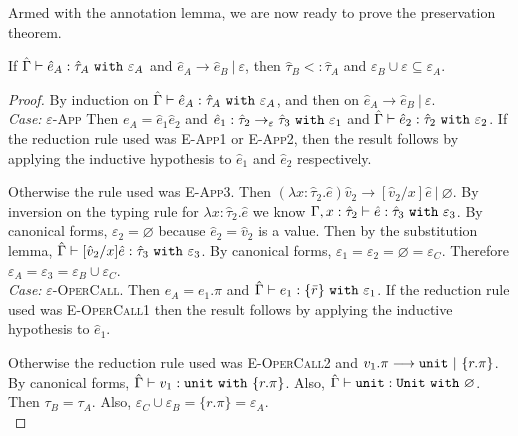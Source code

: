 Armed with the annotation lemma, we are now ready to prove the preservation theorem.

\begin{theorem}[Preservation]
If $\hat \Gamma \vdash \hat e_A: \hat \tau_A~\mathtt{with}~ \varepsilon_A$ and $\hat e_A \longrightarrow \hat e_B~|~\varepsilon$, then $\hat \tau_B <: \hat \tau_A$ and $\varepsilon_B \cup \varepsilon \subseteq \varepsilon_A$.
\end{theorem}

\begin{proof} By induction on $\hat \Gamma \vdash \hat e_A: \hat \tau_A~\mathtt{with}~ \varepsilon_A$, and then on $\hat e_A \longrightarrow \hat e_B~|~\varepsilon$. \\

\textit{Case:} \textsc{$\varepsilon$-App} Then $e_A = \hat e_1 \hat e_2$ and $\hat e_1: \hat \tau_2 \rightarrow_{\varepsilon} \hat \tau_3~\mathtt{with}~ \varepsilon_1$ and $\hat \Gamma \vdash \hat e_2: \hat \tau_2~\mathtt{with}~ \varepsilon_2$. If the reduction rule used was \textsc{E-App1} or \textsc{E-App2}, then the result follows by applying the inductive hypothesis to $\hat e_1$ and $\hat e_2$ respectively.

Otherwise the rule used was \textsc{E-App3}. Then $(\lambda x: \hat \tau_2.\hat e)\hat v_2 \longrightarrow [\hat v_2/x]\hat e~|~\varnothing$. By inversion on the typing rule for $\lambda x: \hat \tau_2.\hat e$ we know $\Gamma, x: \hat \tau_2 \vdash \hat e: \hat \tau_3~\mathtt{with}~ \varepsilon_3$. By canonical forms, $\varepsilon_2 = \varnothing$ because $\hat e_2 = \hat v_2$ is a value. Then by the substitution lemma, $\hat \Gamma \vdash [\hat v_2/x]\hat e : \hat \tau_3~\mathtt{with}~ \varepsilon_3$. By canonical forms, $\varepsilon_1 = \varepsilon_2 = \varnothing = \varepsilon_C$. Therefore $\varepsilon_A = \varepsilon_3 = \varepsilon_B \cup \varepsilon_C$.\\

\textit{Case:} \textsc{$\varepsilon$-OperCall}. Then $e_A = e_1.\pi$ and $\hat \Gamma \vdash e_1 : \{ \bar r \}~\mathtt{with}~ \varepsilon_1$. If the reduction rule used was \textsc{E-OperCall1} then the result follows by applying the inductive hypothesis to $\hat e_1$.

Otherwise the reduction rule used was \textsc{E-OperCall2} and $v_1.\pi \longrightarrow \mathtt{unit}~|~\{ r.\pi \}$. By canonical forms, $\hat \Gamma \vdash v_1: \mathtt{unit}~\mathtt{with}~ \{ r.\pi \}$. Also, $\hat \Gamma \vdash \mathtt{unit}: \mathtt{Unit}~\mathtt{with}~ \varnothing$. Then $\tau_B = \tau_A$. Also, $\varepsilon_C \cup \varepsilon_B = \{ r.\pi \} = \varepsilon_A$.\\


\end{proof}

